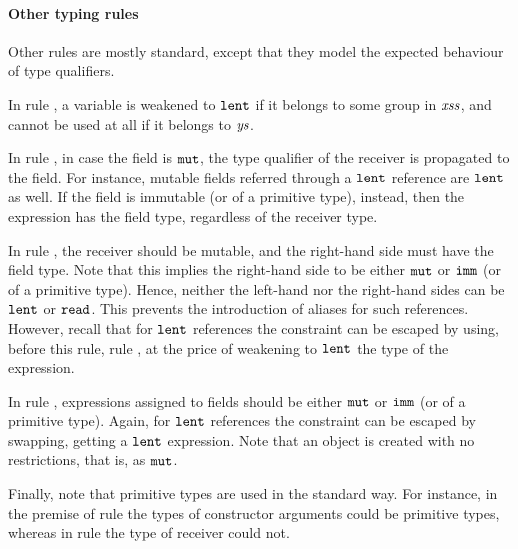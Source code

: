 \paragraph{Other typing rules} 
Other rules are mostly standard, except that they model the expected behaviour of type qualifiers.

{In} rule , a variable is weakened to $\texttt{lent}$ if it belongs to some group in $\mathit{xss}$, and cannot be used at all if it belongs to $\mathit{ys}$. 

In rule , in case the field is $\texttt{mut}$, the type qualifier of the receiver is propagated to the field. For instance, {mutable} fields referred through a $\texttt{lent}$ reference are $\texttt{lent}$ as well. If the field is immutable {(or of a primitive type), instead, then the expression has the field type,} regardless of the receiver type.  

In rule , the receiver should be mutable, and the right-hand side must have the field type. Note that this implies the right-hand side to be either $\texttt{mut}$ or $\texttt{imm}$ {(or of a primitive type)}. Hence, neither the left-hand nor the right-hand sides can be $\texttt{lent}$ or $\texttt{read}$. {This prevents the introduction of aliases for such references. However, recall that for $\texttt{lent}$ references the constraint can be escaped by using, before this rule, rule , at the price of weakening to $\texttt{lent}$ the type of the expression. }
  
In rule , expressions assigned to fields should be either $\texttt{mut}$ or $\texttt{imm}$ (or of a primitive type).  {Again, for $\texttt{lent}$ references the constraint can be escaped by swapping, getting a $\texttt{lent}$ expression. }
 Note that an object is created with no restrictions, that is, as $\texttt{mut}$.

Finally, note that primitive types are used in the standard way. For instance, in the premise of rule  the types of constructor arguments could be primitive types, whereas in rule  the type of receiver could not.  









